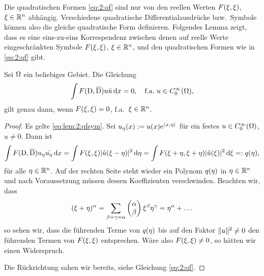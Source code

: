 Die quadratischen Formen \eqref{eq:2:qf}
sind nur von den reellen Werten $F(\xi,\xi)$, $\xi\in\mathbb R^n$ abhängig.
Verschiedene quadratische Differentialausdrücke bzw.~Symbole
können also die gleiche quadratische Form definieren.
Folgendes Lemma zeigt, dass es eine eins-zu-eins
Korrespendenz zwischen denen auf reelle Werte eingeschränkten
Symbole $F(\xi,\xi)$, $\xi\in\mathbb R^n$,
und den quadratischen Formen wie in \eqref{eq:2:qf} gibt.

\begin{lem}\label{lem:2:qfsym}
Sei $\Omega$ ein beliebiges Gebiet.
Die Gleichung
\begin{equation}\label{eq:lem:2:qfsym}
\int F(\mathrm D,\overline{\mathrm D})u\bar{u}\,\mathrm d x=0,
\quad\text{f.a.}~u\in C^\infty_0(\Omega),
\end{equation}
gilt genau dann, wenn $F(\xi,\xi)=0$, f.a.~$\xi\in\mathbb R^n$.
\end{lem}
\begin{proof}
Es gelte \eqref{eq:lem:2:qfsym}.
Sei $u_\eta(x):=u(x)\mathrm e^{\langle x,\eta\rangle}$ für ein festes $u\in C^\infty_0(\Omega)$, $u\neq0$.
Dann ist
\begin{equation}
\int F(\mathrm D,\overline{\mathrm D})u_\eta\bar{u_\eta}\,\mathrm d x
=\int F(\xi,\xi)\lvert\hat{u}(\xi-\eta)\rvert^2\,\mathrm d \eta
=\int F(\xi+\eta,\xi+\eta)\lvert\hat{u}(\xi)\rvert^2\,\mathrm d \xi=:q(\eta),
\end{equation}
für alle $\eta\in\mathbb R^n$.
Auf der rechten Seite steht wieder ein Polynom $q(\eta)$ in $\eta\in\mathbb R^n$
und nach Voraussetzung müssen dessen Koeffizienten verschwinden.
Beachten wir, dass
\begin{equation}
(\xi+\eta)^\alpha=\sum_{\beta+\gamma=\alpha}\begin{pmatrix}\alpha\\\beta\end{pmatrix}\xi^\beta\eta^\gamma=\eta^\alpha+\dots
\end{equation}
so sehen wir, dass die führenden Terme von $q(\eta)$
bis auf den Faktor $\lVert u\rVert^2\neq0$ den führenden Termen von $F(\xi,\xi)$ entsprechen.
Wäre also $F(\xi,\xi)\neq0$, so hätten wir einen Widerspruch.

Die Rückrichtung sahen wir bereits, siehe Gleichung \eqref{eq:2:qf}.
\end{proof}

